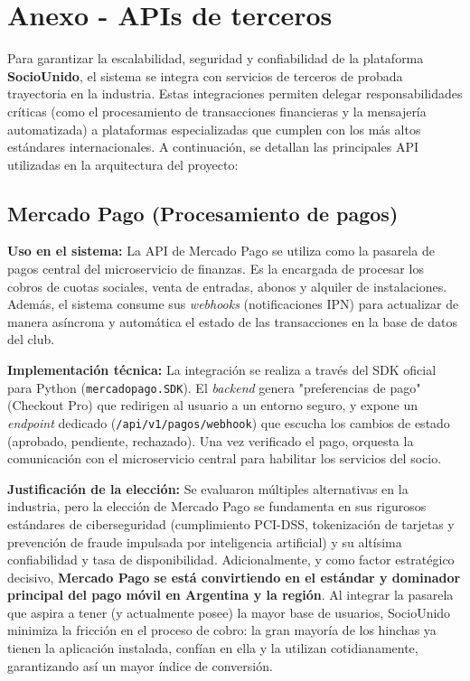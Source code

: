 \section{Anexo - APIs de terceros}

Para garantizar la escalabilidad, seguridad y confiabilidad de la plataforma \textbf{SocioUnido}, el sistema se integra con servicios de terceros de probada trayectoria en la industria. Estas integraciones permiten delegar responsabilidades críticas (como el procesamiento de transacciones financieras y la mensajería automatizada) a plataformas especializadas que cumplen con los más altos estándares internacionales. A continuación, se detallan las principales API utilizadas en la arquitectura del proyecto:

\subsection{Mercado Pago (Procesamiento de pagos)}

\textbf{Uso en el sistema:} La API de Mercado Pago se utiliza como la pasarela de pagos central del microservicio de finanzas. Es la encargada de procesar los cobros de cuotas sociales, venta de entradas, abonos y alquiler de instalaciones. Además, el sistema consume sus \textit{webhooks} (notificaciones IPN) para actualizar de manera asíncrona y automática el estado de las transacciones en la base de datos del club.

\textbf{Implementación técnica:} La integración se realiza a través del SDK oficial para Python (\texttt{mercadopago.SDK}). El \textit{backend} genera "preferencias de pago" (Checkout Pro) que redirigen al usuario a un entorno seguro, y expone un \textit{endpoint} dedicado (\texttt{/api/v1/pagos/webhook}) que escucha los cambios de estado (aprobado, pendiente, rechazado). Una vez verificado el pago, orquesta la comunicación con el microservicio central para habilitar los servicios del socio.

\textbf{Justificación de la elección:} Se evaluaron múltiples alternativas en la industria, pero la elección de Mercado Pago se fundamenta en sus rigurosos estándares de ciberseguridad (cumplimiento PCI-DSS, tokenización de tarjetas y prevención de fraude impulsada por inteligencia artificial) y su altísima confiabilidad y tasa de disponibilidad. Adicionalmente, y como factor estratégico decisivo, \textbf{Mercado Pago se está convirtiendo en el estándar y dominador principal del pago móvil en Argentina y la región}. Al integrar la pasarela que aspira a tener (y actualmente posee) la mayor base de usuarios, SocioUnido minimiza la fricción en el proceso de cobro: la gran mayoría de los hinchas ya tienen la aplicación instalada, confían en ella y la utilizan cotidianamente, garantizando así un mayor índice de conversión.

